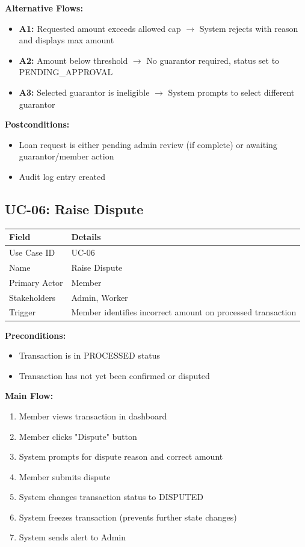 \documentclass[11pt,a4paper]{article}
\begin{document}
\textbf{Alternative Flows:}
\begin{itemize}
    \item \textbf{A1:} Requested amount exceeds allowed cap $\rightarrow$ System rejects with reason and displays max amount
    \item \textbf{A2:} Amount below threshold $\rightarrow$ No guarantor required, status set to PENDING\_APPROVAL
    \item \textbf{A3:} Selected guarantor is ineligible $\rightarrow$ System prompts to select different guarantor
\end{itemize}

\textbf{Postconditions:}
\begin{itemize}
    \item Loan request is either pending admin review (if complete) or awaiting guarantor/member action
    \item Audit log entry created
\end{itemize}

\subsection{UC-06: Raise Dispute}

\begin{tabular}{@{}p{3.5cm}p{9.5cm}@{}}
\toprule
\textbf{Field} & \textbf{Details} \\
\midrule
Use Case ID & UC-06 \\
Name & Raise Dispute \\
Primary Actor & Member \\
Stakeholders & Admin, Worker \\
Trigger & Member identifies incorrect amount on processed transaction \\
\bottomrule
\end{tabular}

\vspace{0.5em}
\textbf{Preconditions:}
\begin{itemize}
    \item Transaction is in PROCESSED status
    \item Transaction has not yet been confirmed or disputed
\end{itemize}

\textbf{Main Flow:}
\begin{enumerate}
    \item Member views transaction in dashboard
    \item Member clicks "Dispute" button
    \item System prompts for dispute reason and correct amount
    \item Member submits dispute
    \item System changes transaction status to DISPUTED
    \item System freezes transaction (prevents further state changes)
    \item System sends alert to Admin
\end{enumerate}
\end{document}
